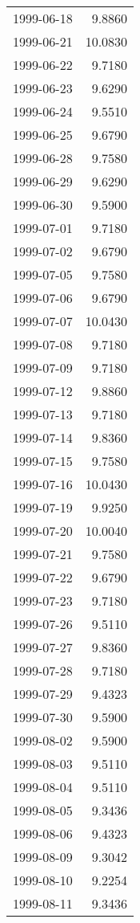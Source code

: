 \begin{tabular}{lr}
1999-06-18 &      9.8860 \\
1999-06-21 &     10.0830 \\
1999-06-22 &      9.7180 \\
1999-06-23 &      9.6290 \\
1999-06-24 &      9.5510 \\
1999-06-25 &      9.6790 \\
1999-06-28 &      9.7580 \\
1999-06-29 &      9.6290 \\
1999-06-30 &      9.5900 \\
1999-07-01 &      9.7180 \\
1999-07-02 &      9.6790 \\
1999-07-05 &      9.7580 \\
1999-07-06 &      9.6790 \\
1999-07-07 &     10.0430 \\
1999-07-08 &      9.7180 \\
1999-07-09 &      9.7180 \\
1999-07-12 &      9.8860 \\
1999-07-13 &      9.7180 \\
1999-07-14 &      9.8360 \\
1999-07-15 &      9.7580 \\
1999-07-16 &     10.0430 \\
1999-07-19 &      9.9250 \\
1999-07-20 &     10.0040 \\
1999-07-21 &      9.7580 \\
1999-07-22 &      9.6790 \\
1999-07-23 &      9.7180 \\
1999-07-26 &      9.5110 \\
1999-07-27 &      9.8360 \\
1999-07-28 &      9.7180 \\
1999-07-29 &      9.4323 \\
1999-07-30 &      9.5900 \\
1999-08-02 &      9.5900 \\
1999-08-03 &      9.5110 \\
1999-08-04 &      9.5110 \\
1999-08-05 &      9.3436 \\
1999-08-06 &      9.4323 \\
1999-08-09 &      9.3042 \\
1999-08-10 &      9.2254 \\
1999-08-11 &      9.3436 \\

\end{tabular}
